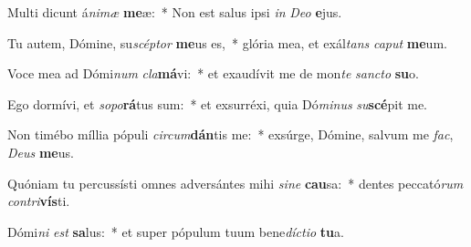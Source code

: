 \item Multi dicunt á\textit{ni}\textit{mæ} \textbf{me}æ:~* Non est salus ipsi \textit{in} \textit{De}\textit{o} \textbf{e}jus.
\item Tu autem, Dómine, su\textit{scép}\textit{tor} \textbf{me}us es,~* glória mea, et exál\textit{tans} \textit{ca}\textit{put} \textbf{me}um.
\item Voce mea ad Dómi\textit{num} \textit{cla}\textbf{má}vi:~* et exaudívit me de mon\textit{te} \textit{sanc}\textit{to} \textbf{su}o.
\item Ego dormívi, et \textit{so}\textit{po}\textbf{rá}tus sum:~* et exsurréxi, quia Dó\textit{mi}\textit{nus} \textit{su}\textbf{scé}pit me.
\item Non timébo míllia pópuli \textit{cir}\textit{cum}\textbf{dán}tis me:~* exsúrge, Dómine, salvum me \textit{fac}, \textit{De}\textit{us} \textbf{me}us.
\item Quóniam tu percussísti omnes adversántes mihi \textit{si}\textit{ne} \textbf{cau}sa:~* dentes peccató\textit{rum} \textit{con}\textit{tri}\textbf{vís}ti.
\item Dómi\textit{ni} \textit{est} \textbf{sa}lus:~* et super pópulum tuum bene\textit{díc}\textit{ti}\textit{o} \textbf{tu}a.
